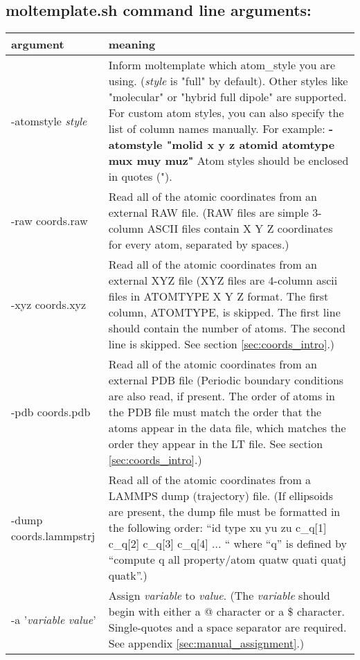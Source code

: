 \documentclass[11pt]{article}
\begin{document}
\subsection{moltemplate.sh command line arguments:}
\label{sec:args_table}
\begin{longtable}[h]{l|p{10cm}}
\textbf{argument} & \textbf{meaning}
\\
\hline
\hline
-atomstyle \textit{style}
&
Inform moltemplate which atom\_style you are using.
(\textit{style} is "full" by default).
Other styles like "molecular" or "hybrid full dipole" are supported.
For custom atom styles, you can also specify the list of column 
names manually.  For example:
\textbf{-atomstyle "molid x y z atomid atomtype mux muy muz"}
Atom styles should be enclosed in quotes (").
\\
\hline
-raw coords.raw
& 
Read all of the atomic coordinates from an external RAW file.
(RAW files are simple 3-column ASCII files contain X Y Z coordinates
 for every atom, separated by spaces.)
\\
\hline
-xyz coords.xyz
& 
Read all of the atomic coordinates from an external XYZ file 
(XYZ files are 4-column ascii files in ATOMTYPE X Y Z format. 
 The first column, ATOMTYPE, is skipped. 
 The first line should contain the number of atoms. 
 The second line is skipped. See section \ref{sec:coords_intro}.)
\\
\hline
-pdb coords.pdb
& 
Read all of the atomic coordinates from an external PDB file
(Periodic boundary conditions are also read, if present.
 The order of atoms in the PDB file
 must match the order that the atoms appear in the data file,
 which matches the order they appear in the LT file.
 See section \ref{sec:coords_intro}.)
\\
\hline
-dump coords.lammpstrj
&
Read all of the atomic coordinates from a LAMMPS dump (trajectory) file.
(If ellipsoids are present, the dump file must be formatted in the
following order:  ``id type xu yu zu c\_q[1] c\_q[2] c\_q[3] c\_q[4] ... ``
where ``q'' is defined by
``compute q all property/atom quatw quati quatj quatk''.)
\\
\hline
-a '\textit{variable} \textit{value}'
& 
Assign \textit{variable} to \textit{value}.
(The \textit{variable} should begin with either a @ character 
 or a \$ character.  
 Single-quotes and a space separator are required.
 See appendix \ref{sec:manual_assignment}.)

\end{longtable}
\end{document}
